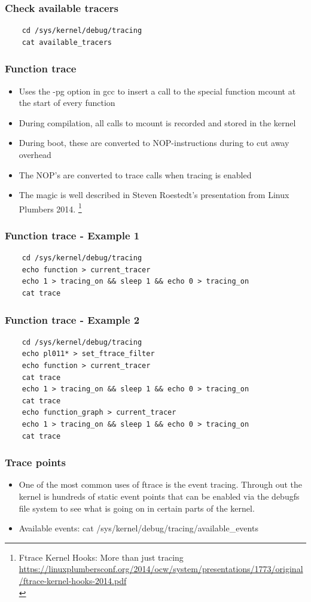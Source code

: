 \documentclass{beamer}
\begin{document}
\begin{frame}[fragile]
\frametitle{Check available tracers}
\begin{verbatim}
	cd /sys/kernel/debug/tracing
	cat available_tracers
\end{verbatim}
\end{frame}

\begin{frame}
\frametitle{Function trace}
\begin{itemize}
	\item Uses the -pg option in gcc to insert a call to the special function mcount\(\) at the start of every function
	\item During compilation, all calls to mcount is recorded and stored in the kernel
	\item During boot, these are converted to NOP-instructions during to cut away overhead
	\item The NOP's are converted to trace calls when tracing is enabled
	\item The magic is well described in Steven Roestedt's presentation from Linux Plumbers 2014. \footnote{Ftrace Kernel Hooks: More than just tracing \url{https://linuxplumbersconf.org/2014/ocw/system/presentations/1773/original/ftrace-kernel-hooks-2014.pdf} \\}
\end{itemize}
\end{frame}

\begin{frame}[fragile]
\frametitle{Function trace - Example 1}
\begin{verbatim}
	cd /sys/kernel/debug/tracing
	echo function > current_tracer
	echo 1 > tracing_on && sleep 1 && echo 0 > tracing_on
	cat trace
\end{verbatim}
\end{frame}

\begin{frame}[fragile]
\frametitle{Function trace - Example 2}
\begin{verbatim}
	cd /sys/kernel/debug/tracing
	echo pl011* > set_ftrace_filter
	echo function > current_tracer
	cat trace
	echo 1 > tracing_on && sleep 1 && echo 0 > tracing_on
	cat trace
	echo function_graph > current_tracer
	echo 1 > tracing_on && sleep 1 && echo 0 > tracing_on
	cat trace
\end{verbatim}
\end{frame}

\begin{frame}
\frametitle{Trace points}
\begin{itemize}
\item One of the most common uses of ftrace is the event tracing.
Through out the kernel is hundreds of static event points that
can be enabled via the debugfs file system to see what is
going on in certain parts of the kernel.
\item Available events: cat /sys/kernel/debug/tracing/available\_events 
\end{itemize}
\end{frame}
\end{document}
